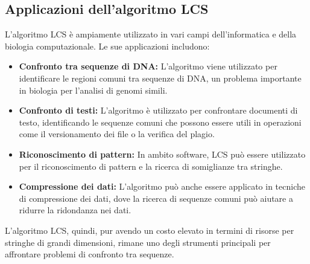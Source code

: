 \begin{ORANGEBOX}
	\subsection{Applicazioni dell'algoritmo LCS}
	
	L'algoritmo LCS è ampiamente utilizzato in vari campi dell'informatica e della biologia computazionale. Le sue applicazioni includono:
	
	\begin{itemize} 
		\item \textbf{Confronto tra sequenze di DNA:} L'algoritmo viene utilizzato per identificare le regioni comuni tra sequenze di DNA, un problema importante in biologia per l'analisi di genomi simili. 
		\item \textbf{Confronto di testi:} L'algoritmo è utilizzato per confrontare documenti di testo, identificando le sequenze comuni che possono essere utili in operazioni come il versionamento dei file o la verifica del plagio. 
		\item \textbf{Riconoscimento di pattern:} In ambito software, LCS può essere utilizzato per il riconoscimento di pattern e la ricerca di somiglianze tra stringhe. 
		\item \textbf{Compressione dei dati:} L'algoritmo può anche essere applicato in tecniche di compressione dei dati, dove la ricerca di sequenze comuni può aiutare a ridurre la ridondanza nei dati. 
	\end{itemize}
	L'algoritmo LCS, quindi, pur avendo un costo elevato in termini di risorse per stringhe di grandi dimensioni, rimane uno degli strumenti principali per affrontare problemi di confronto tra sequenze.
\end{ORANGEBOX}
